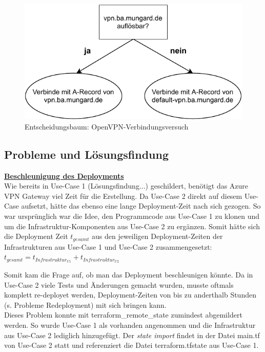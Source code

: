\begin{figure}[h]
  \centering
  \includegraphics{Figures/entscheidungsbaum_openvpn_config.pdf}
  \caption{Entscheidungsbaum: OpenVPN-Verbindungsversuch}
  \label{grafik:Use-Case_2_Entscheidungsbaum_OpenVPN}
\end{figure}\FloatBarrier

\subsection{Probleme und Lösungsfindung}


\textbf{\underline{Beschleunigung des Deployments}}\\
Wie bereits in Use-Case 1 (Lösungsfindung...) geschildert, benötigt das Azure VPN Gateway viel Zeit für die Erstellung. Da Use-Case 2 direkt auf diesem Use-Case aufsetzt, hätte das ebenso eine lange Deployment-Zeit nach sich gezogen. So war ursprünglich war die Idee, den Programmcode aus Use-Case 1 zu klonen und um die Infrastruktur-Komponenten aus Use-Case 2 zu ergänzen. Somit hätte sich die Deployment Zeit $t_{gesamt}$ aus den jeweiligen Deployment-Zeiten der Infrastrukturen aus Use-Case 1 und Use-Case 2 zusammengesetzt:\\
$t_{gesamt} = t_{Infrastruktur_{U1}} + t_{Infrastruktur_{U2}}$

Somit kam die Frage auf, ob man das Deployment beschleunigen könnte. Da in Use-Case 2 viele Tests und Änderungen gemacht wurden, musste oftmals komplett re-deployet werden, Deployment-Zeiten von bis zu anderthalb Stunden (s. Probleme Redeployment) mit sich bringen kann.\\
Dieses Problem konnte mit terraform\_remote\_state zumindest abgemildert werden. So wurde Use-Case 1 als vorhanden angenommen und die Infrastruktur aus Use-Case 2 lediglich hinzugefügt. Der \textit{state import} findet in der Datei main.tf von Use-Case 2 statt und referenziert die Datei terraform.tfstate aus Use-Case 1.

